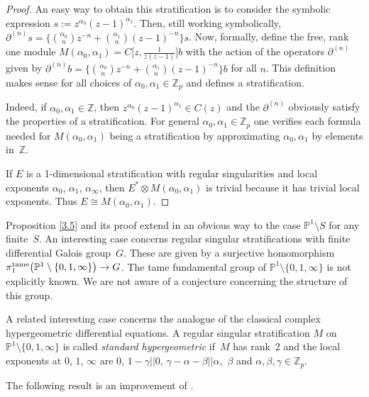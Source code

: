 \documentclass[10pt,a4paper]{amsart}
\numberwithin{equation}{section}
\begin{document}
\begin{proof} An easy way to obtain this stratification is to consider the symbolic expression $s:=z^{\alpha_0}(z-1)^{\alpha _1}$. Then, still working symbolically, $\partial^{(n)}s=\big\{{\alpha _0\choose n }z^{-n}+{\alpha_1\choose n}(z-1)^{-n} \big\}s$. Now, formally, define the free, rank one module $M(\alpha_0,\alpha _1)=C\big[z,\frac{1}{z(z-1)}\big]b$ with the action of the operators $\partial^{(n)}$ given by $\partial^{(n)}b=\big\{{\alpha _0\choose n }z^{-n}+{\alpha_1\choose n}(z-1)^{-n} \big\}b$ for all $n$. This definition makes sense for all choices of $\alpha _0,\alpha _1\in \mathbb{Z}_p$ and defines a stratification.

Indeed, if $\alpha_0, \alpha_1\in \mathbb{Z}$, then $z^{\alpha_0}(z-1)^{\alpha_1}\in C(z)$ and the $\partial^{(n)}$ obviously satisfy the properties of a stratification. For general $\alpha_0,\alpha _1\in \mathbb{Z}_p$ one verifies each formula needed for $M(\alpha _0,\alpha_1)$ being a stratification by approximating $\alpha _0,\alpha_1$ by elements in~$\mathbb{Z}$.

If $E$ is a 1-dimensional stratification with regular singularities and local exponents $\alpha_0$, $\alpha _1$, $\alpha_\infty$, then $E^*\otimes M(\alpha _0,\alpha _1)$ is trivial because it has trivial local exponents. Thus $E\cong M(\alpha_0,\alpha_1)$. \end{proof}

Proposition \ref{3.5} and its proof extend in an obvious way to the case $\mathbb{P}^1\setminus S$ for any finite~$S$. An interesting case concerns regular singular stratifications with finite differential Galois group~$G$. These are given by a surjective homomorphism $\pi_1^{\rm tame}\big(\mathbb{P}^1\setminus \{0,1,\infty \}\big)\rightarrow G$. The tame fundamental group of $\mathbb{P}^1\setminus \{0,1,\infty \}$ is not explicitly known. We are not aware of a conjecture concerning the structure of this group.

A related interesting case concerns the analogue of the classical complex hypergeometric differential equations. A regular singular stratification $M$ on $\mathbb{P}^1\setminus \{0,1,\infty \}$ is called {\it standard hy\-per\-geometric} if~$M$ has rank~2 and the local exponents at $0$, $1$, $\infty$ are $ 0$, $1-\gamma || 0$, $\gamma -\alpha -\beta || \alpha$,~$\beta $ and $\alpha , \beta , \gamma \in \mathbb{Z}_p$.

The following result is an improvement of \cite[Theorem 8.9]{Ma-vdP1}.
\end{document}
